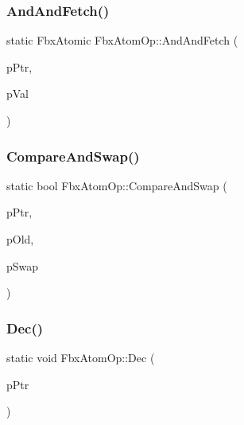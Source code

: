 \mbox{\label{class_fbx_atom_op_a9306c3602d296c4dbcd9bda4c3dd22cb}} 
\subsubsection{\texorpdfstring{And\+And\+Fetch()}{AndAndFetch()}}
{\footnotesize\ttfamily static Fbx\+Atomic Fbx\+Atom\+Op\+::\+And\+And\+Fetch (\begin{DoxyParamCaption}\item[{volatile Fbx\+Atomic $\ast$}]{p\+Ptr,  }\item[{Fbx\+Atomic}]{p\+Val }\end{DoxyParamCaption})\hspace{0.3cm}{\ttfamily [static]}}

\mbox{\label{class_fbx_atom_op_a2f91e98684ce91ba6ef1764ba7b02146}} 
\subsubsection{\texorpdfstring{Compare\+And\+Swap()}{CompareAndSwap()}}
{\footnotesize\ttfamily static bool Fbx\+Atom\+Op\+::\+Compare\+And\+Swap (\begin{DoxyParamCaption}\item[{volatile Fbx\+Atomic $\ast$}]{p\+Ptr,  }\item[{Fbx\+Atomic}]{p\+Old,  }\item[{Fbx\+Atomic}]{p\+Swap }\end{DoxyParamCaption})\hspace{0.3cm}{\ttfamily [static]}}

\mbox{\label{class_fbx_atom_op_a4be312e100244ff3688814e6c2143d29}} 
\subsubsection{\texorpdfstring{Dec()}{Dec()}}
{\footnotesize\ttfamily static void Fbx\+Atom\+Op\+::\+Dec (\begin{DoxyParamCaption}\item[{volatile Fbx\+Atomic $\ast$}]{p\+Ptr }\end{DoxyParamCaption})\hspace{0.3cm}{\ttfamily [static]}}

